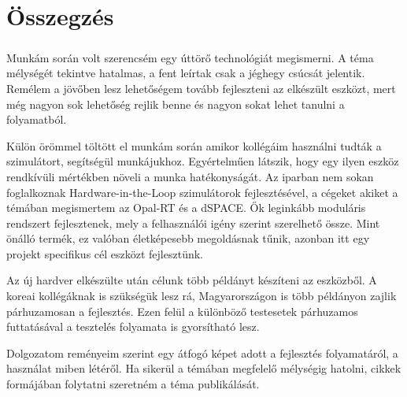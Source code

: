 \chapter{Összegzés}

\paragraph{}
Munkám során volt szerencsém egy úttörő technológiát megismerni. A téma mélységét tekintve hatalmas, a fent leírtak csak a jéghegy csúcsát jelentik. Remélem a jövőben lesz lehetőségem tovább fejleszteni az elkészült eszközt, mert még nagyon sok lehetőség rejlik benne és nagyon sokat lehet tanulni a folyamatból.

Külön örömmel töltött el munkám során amikor kollégáim használni tudták a szimulátort, segítségül munkájukhoz. Egyértelműen látszik, hogy egy ilyen eszköz rendkívüli mértékben növeli a munka hatékonyságát. Az iparban nem sokan foglalkoznak Hardware-in-the-Loop szimulátorok fejlesztésével, a cégeket akiket a témában megismertem az Opal-RT és a dSPACE. Ők leginkább moduláris rendszert fejlesztenek, mely a felhasználói igény szerint szerelhető össze. Mint önálló termék, ez valóban életképesebb megoldásnak tűnik, azonban itt egy projekt specifikus cél eszközt fejlesztünk.

Az új hardver elkészülte után célunk több példányt készíteni az eszközből. A koreai kollégáknak is szükségük lesz rá, Magyarországon is több példányon zajlik párhuzamosan a fejlesztés. Ezen felül a különböző testesetek párhuzamos futtatásával a tesztelés folyamata is gyorsítható lesz.

Dolgozatom reményeim szerint egy átfogó képet adott a fejlesztés folyamatáról, a használat miben létéről. Ha sikerül a témában megfelelő mélységig hatolni, cikkek formájában folytatni szeretném a téma publikálását.
